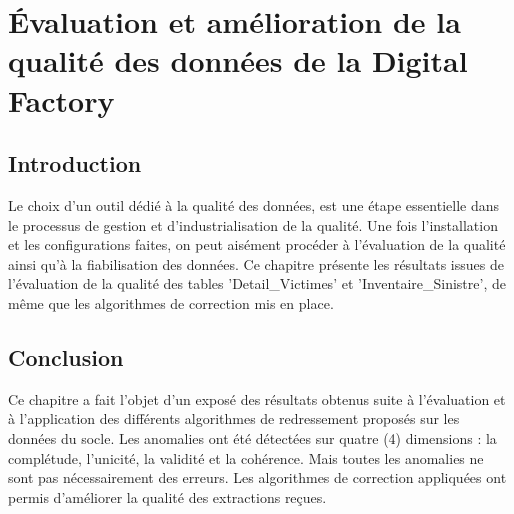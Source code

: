 \chapter{ \'Evaluation et am\'elioration de la qualit\'e des donn\'ees de la Digital Factory }
\section*{Introduction}
Le choix d'un outil d\'edi\'e \`a la qualit\'e des donn\'ees, est une \'etape essentielle dans le processus de gestion et d'industrialisation de la qualit\'e. Une fois l'installation et les configurations faites, on peut ais\'ement proc\'eder \`a l'\'evaluation de la qualit\'e ainsi qu'\`a la fiabilisation des donn\'ees. Ce chapitre pr\'esente les r\'esultats issues de l'\'evaluation de la qualit\'e des tables 'Detail\_Victimes' et 'Inventaire\_Sinistre', de m\^eme que les algorithmes de correction mis en place.



\section*{Conclusion}
Ce chapitre a fait l’objet d’un exposé des résultats obtenus suite à l'\'evaluation et \`a l'application des différents algorithmes de redressement proposés sur les donn\'ees du socle. Les anomalies ont \'et\'e d\'etect\'ees sur quatre (4) dimensions :  la compl\'etude, l'unicit\'e, la validit\'e et la coh\'erence. Mais toutes les anomalies ne sont pas nécessairement des erreurs. Les algorithmes de correction appliqu\'ees ont permis d'améliorer la qualit\'e des extractions reçues.